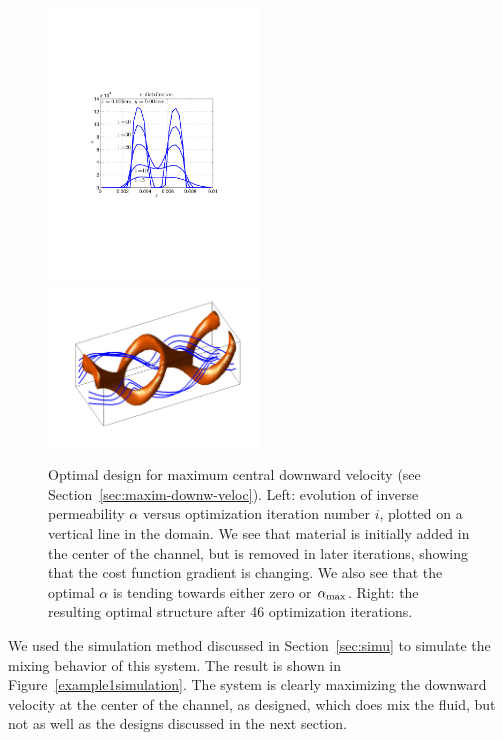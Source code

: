 \documentclass[times]{fldauth}
\begin{document}
\begin{figure}
  \centerline{
    \includegraphics[width=0.5\textwidth,trim=120 240 120 240,clip=true]{example1alphaevolve}
    \includegraphics[width=0.5\textwidth,trim=50 20 35 30,clip=true]{example1structure2}
  }
  \caption{\label{example1structure} Optimal design for maximum
    central downward velocity (see
    Section~\ref{sec:maxim-downw-veloc}). Left: evolution of inverse
    permeability $\alpha$ versus optimization iteration number $i$,
    plotted on a vertical line in the domain. We see that material is
    initially added in the center of the channel, but is removed in
    later iterations, showing that the cost function gradient is
    changing. We also see that the optimal $\alpha$ is tending towards
    either zero or $\alpha_{\rm max}$. Right: the resulting optimal
    structure after 46 optimization iterations.}
\end{figure}

We used the simulation method discussed in Section~\ref{sec:simu} to
simulate the mixing behavior of this system. The result is shown in
Figure~\ref{example1simulation}. The system is clearly maximizing the
downward velocity at the center of the channel, as designed, which
does mix the fluid, but not as well as the designs discussed in the
next section.
\end{document}
